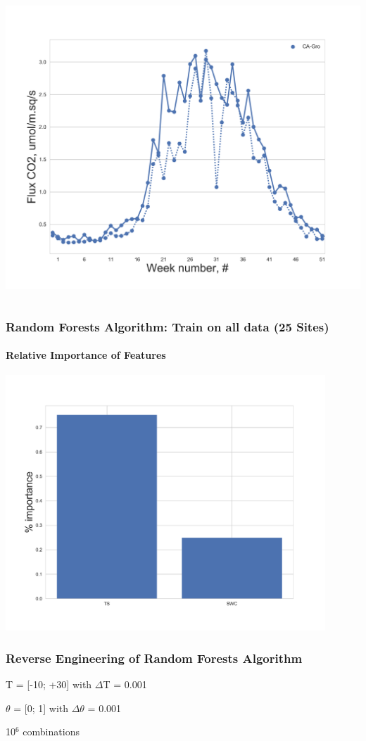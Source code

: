 \documentclass{beamer}
\begin{document}
\begin{frame}
\begin{columns}[t]
\includegraphics[width=\textwidth]{F_ML_train_all/0.png}
\end{columns}

\end{frame}

\begin{frame}
\frametitle{Random Forests Algorithm: Train on all data (25 Sites)}
\framesubtitle{Relative Importance of Features}
\centering
\includegraphics[width=0.9\textwidth]{importance_3.png}\\
\end{frame}


\begin{frame}
\frametitle{Reverse Engineering of Random Forests Algorithm}
\centering
T = [-10; +30] with $\Delta$T = 0.001

$\theta$ = [0; 1] with $\Delta \theta$ =  0.001

10$^6$ combinations
\end{frame}
\end{document}
